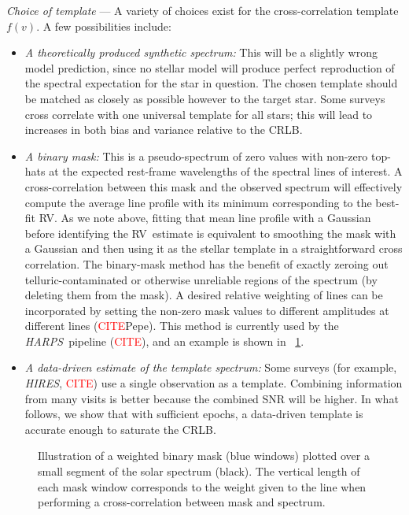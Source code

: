 \documentclass[modern]{aastex63}
\renewcommand{\paragraph}[1]{\bigskip\par\noindent\textsl{#1} ---}
\newcommand{\todo}[1]{\textcolor{red}{#1}}  %
\newcommand{\CITE}{\todo{CITE}}
\newcommand{\acronym}[1]{{\small{#1}}}
\newcommand{\project}[1]{\textsl{#1}}
\newcommand{\HARPS}{\project{\acronym{HARPS}}}
\newcommand{\HIRES}{\project{\acronym{HIRES}}}
\newcommand{\RV}{\acronym{RV}}
\newcommand{\CRLB}{\acronym{CRLB}}
\begin{document}
\paragraph{Choice of template}
A variety of choices exist for the cross-correlation template
$f(v)$. A few possibilities include:
\begin{itemize}
\item \emph{A theoretically produced synthetic spectrum:}
  This will be a slightly wrong model prediction,
  since no stellar model will produce perfect reproduction of the
  spectral expectation for the star in question.
  The chosen template should be matched as closely as possible however
  to the target star. Some surveys cross correlate with one universal
  template for all stars; this will lead to increases in both bias and
  variance relative to the \CRLB.
\item \emph{A binary mask:}
  This is a pseudo-spectrum of zero values with non-zero top-hats at the
  expected rest-frame wavelengths of the spectral lines of interest.
  A cross-correlation between this mask and the observed spectrum will
  effectively compute the average line profile with its minimum
  corresponding to the best-fit RV.
  As we note above, fitting that mean line profile with a Gaussian
  before identifying the \RV\ estimate is equivalent to smoothing the
  mask with a Gaussian and then using it as the stellar template in a
  straightforward cross correlation.
  The binary-mask method has the benefit of exactly zeroing out
  telluric-contaminated or otherwise unreliable regions of the
  spectrum (by deleting them from the mask).
  A desired relative weighting of lines can be incorporated by setting
  the non-zero mask values to different amplitudes at different lines
  (\CITE Pepe). This method is currently used by the \HARPS\ pipeline
  (\CITE), and an example is shown in \figurename~\ref{fig:binarymask}.
\item \emph{A data-driven estimate of the template spectrum:}
  Some surveys (for example, \HIRES, \CITE) use a single observation as a
  template.
  Combining information from many visits is better because the
  combined SNR will be higher.
  In what follows, we show that with sufficient epochs, a data-driven
  template is accurate enough to saturate the \CRLB.
\end{itemize}
\begin{figure}[htp]
\centering
\caption{Illustration of a weighted binary mask (blue windows) plotted over a small segment of the solar spectrum (black). The vertical length of each mask window corresponds to the weight given to the line when performing a cross-correlation between mask and spectrum.}
\label{fig:binarymask}
\end{figure}
\end{document}
